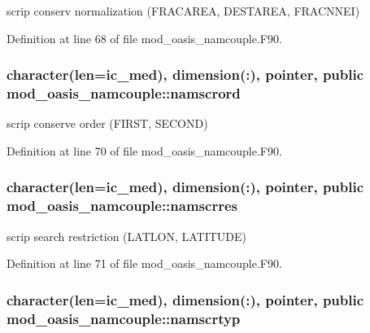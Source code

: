 scrip conserv normalization (F\+R\+A\+C\+A\+R\+E\+A, D\+E\+S\+T\+A\+R\+E\+A, F\+R\+A\+C\+N\+N\+E\+I) 



Definition at line 68 of file mod\+\_\+oasis\+\_\+namcouple.\+F90.

\hypertarget{classmod__oasis__namcouple_ac881ced105604879ada860fabd677481}{
\subsubsection[{namscrord}]{\setlength{\rightskip}{0pt plus 5cm}character(len=ic\+\_\+med), dimension(\+:), pointer, public mod\+\_\+oasis\+\_\+namcouple\+::namscrord}}\label{classmod__oasis__namcouple_ac881ced105604879ada860fabd677481}


scrip conserve order (F\+I\+R\+S\+T, S\+E\+C\+O\+N\+D) 



Definition at line 70 of file mod\+\_\+oasis\+\_\+namcouple.\+F90.

\hypertarget{classmod__oasis__namcouple_a6a95ddbbbc615e0257d93d05e4546239}{
\subsubsection[{namscrres}]{\setlength{\rightskip}{0pt plus 5cm}character(len=ic\+\_\+med), dimension(\+:), pointer, public mod\+\_\+oasis\+\_\+namcouple\+::namscrres}}\label{classmod__oasis__namcouple_a6a95ddbbbc615e0257d93d05e4546239}


scrip search restriction (L\+A\+T\+L\+O\+N, L\+A\+T\+I\+T\+U\+D\+E) 



Definition at line 71 of file mod\+\_\+oasis\+\_\+namcouple.\+F90.

\hypertarget{classmod__oasis__namcouple_a8ddbaabd22bbf485888b1df5f3578909}{
\subsubsection[{namscrtyp}]{\setlength{\rightskip}{0pt plus 5cm}character(len=ic\+\_\+med), dimension(\+:), pointer, public mod\+\_\+oasis\+\_\+namcouple\+::namscrtyp}}\label{classmod__oasis__namcouple_a8ddbaabd22bbf485888b1df5f3578909}


